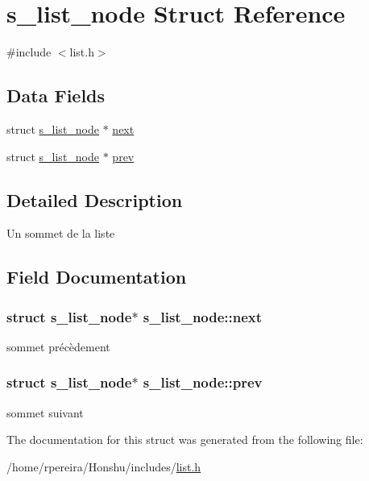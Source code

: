 \hypertarget{structs__list__node}{}\section{s\+\_\+list\+\_\+node Struct Reference}
\label{structs__list__node}


{\ttfamily \#include $<$list.\+h$>$}

\subsection*{Data Fields}
\begin{DoxyCompactItemize}
\item 
struct \hyperlink{structs__list__node}{s\+\_\+list\+\_\+node} $\ast$ \hyperlink{structs__list__node_ac7276a9f1c0e95652a447c40556a474b}{next}
\item 
struct \hyperlink{structs__list__node}{s\+\_\+list\+\_\+node} $\ast$ \hyperlink{structs__list__node_a5aab2b470c7b670ca8e6df4c87aef533}{prev}
\end{DoxyCompactItemize}


\subsection{Detailed Description}
Un sommet de la liste 

\subsection{Field Documentation}
\subsubsection[{\texorpdfstring{next}{next}}]{\setlength{\rightskip}{0pt plus 5cm}struct {\bf s\+\_\+list\+\_\+node}$\ast$ s\+\_\+list\+\_\+node\+::next}\hypertarget{structs__list__node_ac7276a9f1c0e95652a447c40556a474b}{}\label{structs__list__node_ac7276a9f1c0e95652a447c40556a474b}
sommet précèdement 
\subsubsection[{\texorpdfstring{prev}{prev}}]{\setlength{\rightskip}{0pt plus 5cm}struct {\bf s\+\_\+list\+\_\+node}$\ast$ s\+\_\+list\+\_\+node\+::prev}\hypertarget{structs__list__node_a5aab2b470c7b670ca8e6df4c87aef533}{}\label{structs__list__node_a5aab2b470c7b670ca8e6df4c87aef533}
sommet suivant 

The documentation for this struct was generated from the following file\+:\begin{DoxyCompactItemize}
\item 
/home/rpereira/\+Honshu/includes/\hyperlink{list_8h}{list.\+h}\end{DoxyCompactItemize}
